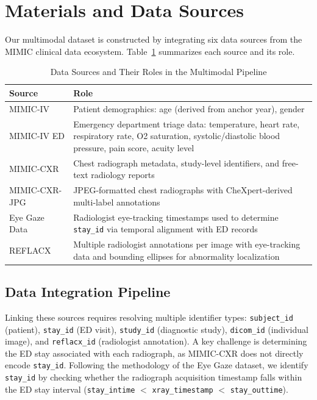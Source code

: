 \documentclass[conference]{IEEEtran}
\begin{document}
\section{Materials and Data Sources}\label{sec:data}

Our multimodal dataset is constructed by integrating six data sources from the MIMIC clinical data ecosystem. Table~\ref{tab:datasources} summarizes each source and its role.

\begin{table}[htbp]
\caption{Data Sources and Their Roles in the Multimodal Pipeline}
\label{tab:datasources}
\begin{center}
\begin{tabular}{p{2.2cm}p{5.5cm}}
\toprule
\textbf{Source} & \textbf{Role} \\
\midrule
MIMIC-IV~\cite{johnson2023mimiciv} & Patient demographics: age (derived from anchor year), gender \\
\midrule
MIMIC-IV ED & Emergency department triage data: temperature, heart rate, respiratory rate, O2 saturation, systolic/diastolic blood pressure, pain score, acuity level \\
\midrule
MIMIC-CXR~\cite{johnson2019mimiccxr} & Chest radiograph metadata, study-level identifiers, and free-text radiology reports \\
\midrule
MIMIC-CXR-JPG~\cite{johnson2021mimiccxrjpg} & JPEG-formatted chest radiographs with CheXpert-derived multi-label annotations \\
\midrule
Eye Gaze Data & Radiologist eye-tracking timestamps used to determine \texttt{stay\_id} via temporal alignment with ED records \\
\midrule
REFLACX~\cite{bigolin2022reflacx} & Multiple radiologist annotations per image with eye-tracking data and bounding ellipses for abnormality localization \\
\bottomrule
\end{tabular}
\end{center}
\end{table}

\subsection{Data Integration Pipeline}

Linking these sources requires resolving multiple identifier types: \texttt{subject\_id} (patient), \texttt{stay\_id} (ED visit), \texttt{study\_id} (diagnostic study), \texttt{dicom\_id} (individual image), and \texttt{reflacx\_id} (radiologist annotation). A key challenge is determining the ED stay associated with each radiograph, as MIMIC-CXR does not directly encode \texttt{stay\_id}. Following the methodology of the Eye Gaze dataset, we identify \texttt{stay\_id} by checking whether the radiograph acquisition timestamp falls within the ED stay interval (\texttt{stay\_intime} $<$ \texttt{xray\_timestamp} $<$ \texttt{stay\_outtime}).
\end{document}
